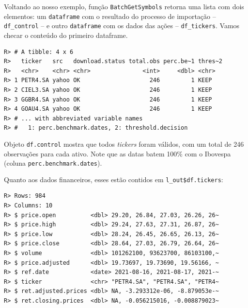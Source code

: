 \documentclass[
  11pt,
]{book}
\newenvironment{Shaded}{\begin{snugshade}}{\end{snugshade}}
\newcommand{\CommentTok}[1]{\textcolor[rgb]{0.37,0.37,0.37}{\textit{#1}}}
\newcommand{\FunctionTok}[1]{\textcolor[rgb]{0,0,0}{#1}}
\newcommand{\NormalTok}[1]{#1}
\newcommand{\SpecialCharTok}[1]{\textcolor[rgb]{0,0,0}{#1}}
\begin{document}
Voltando ao nosso exemplo, função \texttt{BatchGetSymbols} retorna uma lista com dois elementos: um \texttt{dataframe} com o resultado do processo de importação -- \texttt{df\_control} -- e outro \texttt{dataframe} com os dados das ações -- \texttt{df\_tickers}. Vamos checar o conteúdo do primeiro dataframe.

\begin{Shaded}
\end{Shaded}

\begin{verbatim}
R> # A tibble: 4 x 6
R>   ticker   src   download.status total.obs perc.be~1 thres~2
R>   <chr>    <chr> <chr>               <int>     <dbl> <chr>  
R> 1 PETR4.SA yahoo OK                    246         1 KEEP   
R> 2 CIEL3.SA yahoo OK                    246         1 KEEP   
R> 3 GGBR4.SA yahoo OK                    246         1 KEEP   
R> 4 GOAU4.SA yahoo OK                    246         1 KEEP   
R> # ... with abbreviated variable names
R> #   1: perc.benchmark.dates, 2: threshold.decision
\end{verbatim}

Objeto \texttt{df.control} mostra que todos \emph{tickers} foram válidos, com um total de 246 observações para cada ativo. Note que as datas batem 100\% com o Ibovespa (coluna \texttt{perc.benchmark.dates}).

Quanto aos dados financeiros, esses estão contidos em \texttt{l\_out\$df.tickers}:

\begin{Shaded}
\end{Shaded}

\begin{verbatim}
R> Rows: 984
R> Columns: 10
R> $ price.open          <dbl> 29.20, 26.84, 27.03, 26.26, 26~
R> $ price.high          <dbl> 29.24, 27.63, 27.31, 26.87, 26~
R> $ price.low           <dbl> 28.24, 26.45, 26.65, 26.13, 26~
R> $ price.close         <dbl> 28.64, 27.03, 26.79, 26.64, 26~
R> $ volume              <dbl> 101262100, 93623700, 86103100,~
R> $ price.adjusted      <dbl> 19.73697, 19.73690, 19.56166, ~
R> $ ref.date            <date> 2021-08-16, 2021-08-17, 2021-~
R> $ ticker              <chr> "PETR4.SA", "PETR4.SA", "PETR4~
R> $ ret.adjusted.prices <dbl> NA, -3.293312e-06, -8.879053e-~
R> $ ret.closing.prices  <dbl> NA, -0.056215016, -0.008879023~
\end{verbatim}
\end{document}

